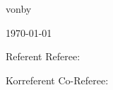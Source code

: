 \begin{titlepage}
	\begin{center}
		{von}{by}
		\par\end{center}

	\begin{center}
		\theAuthor
		\par\end{center}

	\begin{center}
		\today
		\par\end{center}

	\vspace{1.5cm}

	{Referent}
	{Referee}: \theFirstReferee

	{Korreferent}
	{Co-Referee}: \theSecondReferee

\end{titlepage}

\thispagestyle{empty}

\cleardoublepage

\printGenerativeAIDeclaration

\printDeclarationOfIndependence

\clearpage
\mbox{}\thispagestyle{empty}
